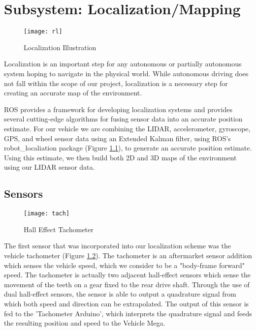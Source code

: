 \chapter{Subsystem: Localization/Mapping} \label{chap:Localization}


\begin{figure}[H]
	\centerline{\texttt{[image: rl]}}
	\caption[]{Localization Illustration \cite{clearpath}}
	\label{fig:robotlocalization}
\end{figure}

Localization is an important step for any autonomous or partially autonomous system hoping to navigate in the physical world. While autonomous driving does not fall within the scope of our project, localization is a necessary step for creating an accurate map of the environment. 

ROS provides a framework for developing localization systems and provides several cutting-edge algorithms for fusing sensor data into an accurate position estimate. For our vehicle we are combining the LIDAR, accelerometer, gyroscope, GPS, and wheel sensor data using an Extended Kalman filter, using ROS's robot\_localiation package (Figure \ref{fig:robotlocalization}), to generate an accurate position estimate. Using this estimate, we then build both 2D and 3D maps of the environment using our LIDAR sensor data. 

\section{Sensors}


\begin{figure}[H]
	\centerline{\texttt{[image: tach]}}
	\caption[]{Hall Effect Tachometer}
	\label{fig:tach}
\end{figure}

The first sensor that was incorporated into our localization scheme was the vehicle tachometer (Figure \ref{fig:tach}). The tachometer is an aftermarket sensor addition which senses the vehicle speed, which we consider to be a "body-frame forward" speed. The tachometer is actually two adjacent hall-effect sensors which sense the movement of the teeth on a gear fixed to the rear drive shaft. Through the use of dual hall-effect sensors, the sensor is able to output a quadrature signal from which both speed and direction can be extrapolated. The output of this sensor is fed to the 'Tachometer Arduino', which interprets the quadrature signal and feeds the resulting position and speed to the Vehicle Mega.

